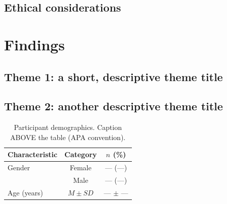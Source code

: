 \documentclass[11pt,a4paper]{article}
\begin{document}
\subsection{Ethical considerations}

\section{Findings}
\label{sec:findings}

\subsection{Theme 1: a short, descriptive theme title}

\subsection{Theme 2: another descriptive theme title}


\begin{table}[t]
\caption{Participant demographics. Caption ABOVE the table (APA convention).}
\label{tab:demographics}
\centering
\begin{tabular}{lcc}
\toprule
Characteristic & Category & $n$ (\%) \\
\midrule
Gender         & Female   & --- (---) \\
               & Male     & --- (---) \\
Age (years)    & $M \pm SD$ & --- $\pm$ --- \\
\bottomrule
\end{tabular}
\end{table}
\end{document}
